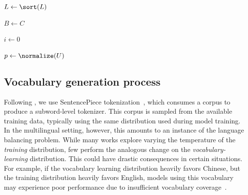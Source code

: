 \documentclass{article} %
\newcommand{\unimax}{\textsc{UniMax}}
\begin{document}
\begin{algorithm}[h]

    
    $L \leftarrow \sort(L)$
    
    $B \leftarrow C$ 
    
    $i \leftarrow 0$
    

    $p \leftarrow \normalize(U)$
    
    \caption{\unimax{}}
    \label{alg:unimax}
\end{algorithm}


\subsection{Vocabulary generation process}
\label{sec:vocab_generation_process}

Following \citet{xue-etal-2021-mt5}, we use SentencePiece tokenization~\citep{Kudo2018_SPM}, which consumes a corpus to produce a subword-level tokenizer. This corpus is sampled from the available training data, typically using the same distribution used during model training. In the multilingual setting, however, this amounts to an instance of the language balancing problem. While many works explore varying the temperature of the \textit{training} distribution, few perform the analogous change on the \textit{vocabulary-learning} distribution. This could have drastic consequences in certain situations. For example, if the vocabulary learning distribution heavily favors Chinese, but the training distribution heavily favors English, models using this vocabulary may experience poor performance due to insufficient vocabulary coverage~\citep{chung2020_clustering}.
\end{document}

